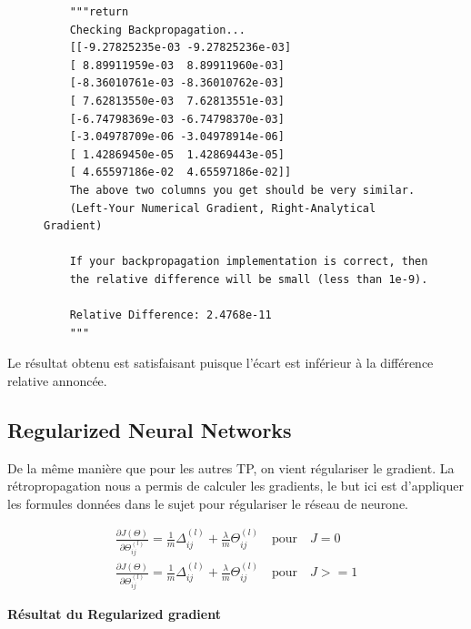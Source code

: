 \begin{figure}[!h]
    \begin{verbatim}
    """return 
    Checking Backpropagation... 
    [[-9.27825235e-03 -9.27825236e-03]
    [ 8.89911959e-03  8.89911960e-03]
    [-8.36010761e-03 -8.36010762e-03]
    [ 7.62813550e-03  7.62813551e-03]
    [-6.74798369e-03 -6.74798370e-03]
    [-3.04978709e-06 -3.04978914e-06]
    [ 1.42869450e-05  1.42869443e-05]
    [ 4.65597186e-02  4.65597186e-02]]
    The above two columns you get should be very similar.
    (Left-Your Numerical Gradient, Right-Analytical Gradient)

    If your backpropagation implementation is correct, then
    the relative difference will be small (less than 1e-9). 

    Relative Difference: 2.4768e-11 
    """
    \end{verbatim}   
\end{figure}

\noindent
Le résultat obtenu est satisfaisant puisque l'écart est inférieur à la différence relative annoncée. 

\clearpage

\subsection{Regularized Neural Networks}

De la même manière que pour les autres TP, on vient régulariser le gradient. La rétropropagation nous a 
permis de calculer les gradients, le but ici est d'appliquer les formules données dans le sujet pour 
régulariser le réseau de neurone. 

\begin{align}
    \frac{\partial J(\Theta)}{\partial \Theta_{ij}^{(l)}} = \frac{1}{m} \Delta_{ij}^{(l)} + \frac{\lambda}{m} \Theta_{ij}^{(l)} \quad \text{pour} \quad  J = 0   \\
    \frac{\partial J(\Theta)}{\partial \Theta_{ij}^{(l)}} = \frac{1}{m} \Delta_{ij}^{(l)} + \frac{\lambda}{m} \Theta_{ij}^{(l)} \quad \text{pour} \quad  J >= 1
\end{align}

\vspace{0.4cm}
\noindent
\textbf{Résultat du Regularized gradient}

